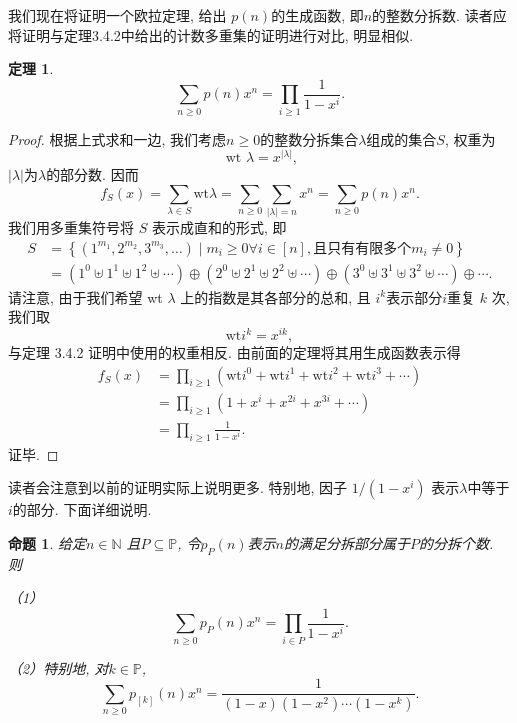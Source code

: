 \documentclass[a4paper,12pt]{ctexbook}
\newtheorem{theorem}[lemma]{\hspace{2em}定理}%
\newtheorem{proposition}[lemma]{\hspace{2em}命题}
\begin{document}
我们现在将证明一个欧拉定理, 给出 $p(n)$的生成函数, 即$n$的整数分拆数. 读者应将证明与定理3.4.2中给出的计数多重集的证明进行对比, 明显相似.
\begin{theorem}
	$$
	\sum_{n \geq 0} p(n) x^{n}=\prod_{i \geq 1} \frac{1}{1-x^{i}} .
	$$
\end{theorem}
\begin{proof}
	根据上式求和一边, 我们考虑$n \geq 0$的整数分拆集合$\lambda$组成的集合$S$, 权重为\[
	\text { wt } \lambda=x^{|\lambda|}\tag{3.11},
	\] $|\lambda|$为$\lambda$的部分数. 因而$$
	f_{S}(x)=\sum_{\lambda \in S} \mathrm{wt} \lambda=\sum_{n \geq 0} \sum_{|\lambda|=n} x^{n}=\sum_{n \geq 0} p(n) x^{n} .
	$$我们用多重集符号将 $S$ 表示成直和的形式, 即$$
	\begin{aligned}
	S &=\left\{\left(1^{m_{1}}, 2^{m_{2}}, 3^{m_{3}}, \ldots\right) \mid m_{i} \geq 0 \forall  i\in [n] ,\text {且只有有限多个} m_{i} \neq 0\right\} \\
	&=\left(1^{0} \uplus 1^{1} \uplus 1^{2} \uplus \cdots\right) \oplus\left(2^{0} \uplus 2^{1} \uplus 2^{2} \uplus \cdots\right) \oplus\left(3^{0} \uplus 3^{1} \uplus 3^{2} \uplus \cdots\right) \oplus \cdots.
	\end{aligned}
	$$请注意, 由于我们希望 wt $\lambda$ 上的指数是其各部分的总和, 且 $i^{k}$表示部分$i$重复 $k$ 次, 我们取$$
	\mathrm{wt} i^{k}=x^{i k},
	$$与定理 3.4.2 证明中使用的权重相反. 由前面的定理将其用生成函数表示得$$
	\begin{aligned}
	f_{S}(x) &=\prod_{i \geq 1}\left(\mathrm{wt} i^{0}+\mathrm{wt} i^{1}+\mathrm{wt} i^{2}+\mathrm{wt} i^{3}+\cdots\right) \\
	&=\prod_{i \geq 1}\left(1+x^{i}+x^{2 i}+x^{3 i}+\cdots\right) \\
	&=\prod_{i \geq 1} \frac{1}{1-x^{i}}.
	\end{aligned}
	$$证毕.
\end{proof}

读者会注意到以前的证明实际上说明更多. 特别地, 因子 $1 /\left(1-x^{i}\right)$ 表示$\lambda$中等于$i$的部分. 下面详细说明.
\begin{proposition}
	给定$n \in \mathbb{N}$ 且$P \subseteq \mathbb{P}$, 令$p_{P}(n)$表示$n$的满足分拆部分属于$P$的分拆个数. 则

	（1）$$
	\sum_{n \geq 0} p_{P}(n) x^{n}=\prod_{i \in P} \frac{1}{1-x^{i}} .
	$$

	（2）特别地, 对$k \in \mathbb{P}$, $$
	\sum_{n \geq 0} p_{[k]}(n) x^{n}=\frac{1}{(1-x)\left(1-x^{2}\right) \cdots\left(1-x^{k}\right)}.
	$$
\end{proposition}
\end{document}
